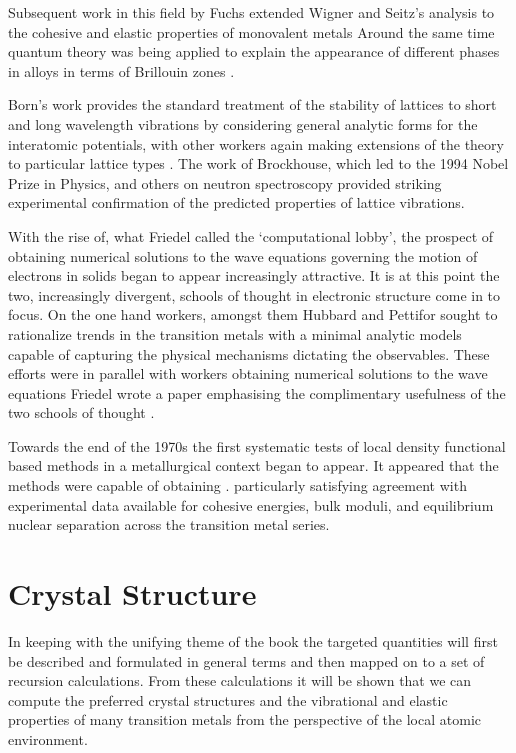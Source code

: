 Subsequent work in this field by Fuchs extended Wigner and Seitz's analysis
to the cohesive and elastic properties of monovalent metals \cite{fuchs35, fuchs36} 
Around the same time quantum theory was being
applied to explain the appearance of different phases in alloys in terms 
of Brillouin zones \cite{bethe29, bouckhaert36, owen33, jones34}. 

Born's work provides the standard treatment of 
the stability of lattices to short and long wavelength
vibrations by considering general analytic forms for the interatomic potentials\cite{born40,born42},
with other workers again making extensions of the theory to particular
lattice types \cite{power41, nabarro52}. The work of Brockhouse, which led to the 1994
Nobel Prize in Physics, and others on neutron spectroscopy provided striking 
experimental confirmation of the predicted properties of lattice vibrations\cite{brockhouse62}.

With the rise of, what Friedel called the `computational lobby', the prospect 
of obtaining numerical solutions to the wave equations governing the motion of 
electrons in solids began to appear increasingly attractive. It is at this
point the two, increasingly divergent, schools of thought in electronic structure
come in to focus. On the one hand workers, amongst them Hubbard and Pettifor \cite{ziman65, hubbard67, pettifor69} sought
to rationalize trends in the transition metals with a minimal analytic models capable of 
capturing the physical mechanisms dictating the observables. These efforts were in parallel 
with workers obtaining numerical solutions to the wave equations \cite{andersen75, jepsen75}
Friedel wrote a paper emphasising the complimentary usefulness of the two schools of thought
\cite{friedel73}.

Towards the end of the 1970s the first systematic tests of local density 
functional based methods in a metallurgical context began to appear.
It appeared that the methods were capable of obtaining \cite{moruzzi77, gelatt77}. 
particularly satisfying agreement with experimental data available for 
cohesive energies, bulk moduli, and equilibrium nuclear separation across 
the transition metal series.

\section{Crystal Structure}
In keeping with the unifying theme of the book the targeted quantities
will first be described and formulated in general terms and then mapped
on to a set of recursion calculations. From these calculations it will be
shown that we can compute the preferred crystal structures and the vibrational and 
elastic properties of many transition metals from the perspective of the 
local atomic environment.

